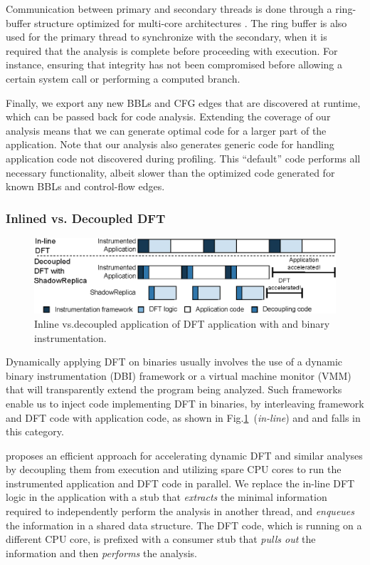 Communication between primary and secondary threads is done through a
ring-buffer structure optimized for multi-core architectures . The ring buffer
is also used for the primary thread to synchronize with the secondary, when it
is required that the analysis is complete before proceeding with execution. For
instance, ensuring that integrity has not been compromised before allowing a
certain system call or performing a computed branch.

Finally, we export any new BBLs and CFG edges that are discovered at runtime,
which can be passed back for code analysis. Extending the coverage of our
analysis means that we can generate optimal code for a larger part of the
application. Note that our analysis also generates generic code for handling
application code not discovered during profiling. This “default” code performs
all necessary functionality, albeit slower than the optimized code generated
for known BBLs and control-flow edges.

\subsubsection{Inlined vs. Decoupled DFT}
\label{sec:inlinevsdecoupled}

\begin{figure}[tb]
    \centering
    \includegraphics[width=0.75\linewidth]{figs/decoupling.eps}
    \caption{Inline vs.decoupled application of DFT application with \sreplica
    and binary instrumentation.\label{fig:decoupling}}
\end{figure}

Dynamically applying DFT on binaries usually involves the use of a dynamic
binary instrumentation (DBI) framework or a virtual machine monitor (VMM) that
will transparently extend the program being analyzed. Such frameworks enable us
to inject code implementing DFT in binaries, by interleaving framework and DFT
code with application code, as shown in
Fig.\ref{fig:decoupling}~(\textit{in-line}) and \libdft and \tfa falls in this
category.

\sreplica proposes an efficient approach for accelerating dynamic DFT and similar
analyses by decoupling them from execution and utilizing spare CPU cores to run
the instrumented application and DFT code in parallel. We replace the in-line
DFT logic in the application with a stub that \emph{extracts} the minimal
information required to independently perform the analysis in another thread,
and \emph{enqueues} the information in a shared data structure. The DFT code,
which is running on a different CPU core, is prefixed with a consumer stub that
\emph{pulls out} the information and then \emph{performs} the analysis.


